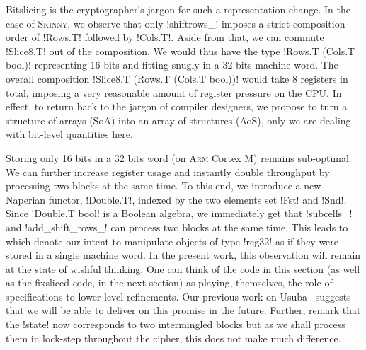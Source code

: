 \documentclass[draft,english]{jflart}
\newcommand{\Skinny}{\textsc{Skinny}}
\begin{document}

Bitslicing is the cryptographer's jargon for such a representation
change. In the case of \Skinny{}, we observe that only \coqe!shiftrows_!
imposes a strict composition order of \coqe!Rows.T! followed by
\coqe!Cols.T!. Aside from that, we can commute \coqe!Slice8.T! out of the
composition. We would thus have the type \coqe!Rows.T (Cols.T bool)!
representing 16 bits and fitting snugly in a 32 bits machine word. The
overall composition \coqe!Slice8.T (Rows.T (Cols.T bool))! would take
8 registers in total, imposing a very reasonable amount of register
pressure on the CPU.
%
In effect, to return back to the jargon of compiler designers, we
propose to turn a structure-of-arrays (SoA) into an
array-of-structures (AoS), only we are dealing with bit-level
quantities here.



Storing only 16 bits in a 32 bits word (on \textsc{Arm} Cortex M)
remains sub-optimal. We can further increase register usage and
instantly double throughput by processing two blocks at the same
time. To this end, we introduce a new Naperian functor,
\coqe!Double.T!, indexed by the two elements set \coqe!Fst!  and
\coqe!Snd!. Since \coqe!Double.T bool! is a Boolean algebra, we immediately get that \coqe!subcells_! and \coqe!add_shift_rows_! can process two blocks at the same time. This leads to
%
%
which denote our intent to manipulate objects of type \coqe!reg32! as
if they were stored in a single machine word.  In the present work,
this observation will remain at the state of wishful thinking. One can
think of the code in this section (as well as the fixsliced code, in
the next section) as playing, themselves, the role of specifications
to lower-level refinements. Our previous work on Usuba~\citep{mercadier:PhD} suggests that
we will be able to deliver on this promise in the future. Further,
remark that the \coqe!state! now corresponds to two intermingled
blocks but as we shall process them in lock-step throughout the
cipher, this does not make much difference.
\end{document}
